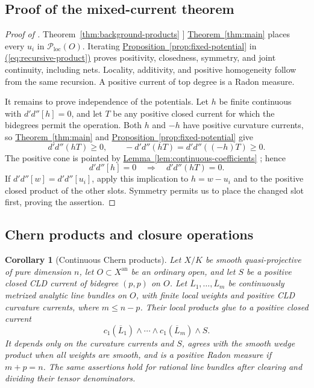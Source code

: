 \documentclass[11pt]{amsart}
\newtheorem{corollary}[theorem]{Corollary}
\theoremstyle{definition}
\theoremstyle{remark}
\numberwithin{equation}{section}
\newcommand{\ddc}{d'd''}
\newcommand{\an}{\mathrm{an}}
\newcommand{\Ploc}{\mathcal P_{\mathrm{loc}}}
\newcommand{\namedref}[2]{%
 \begingroup
 \ifstrequal{#1}{Section}{\hypersetup{linkcolor=sectionteal}}{%
  \ifstrequal{#1}{Appendix}{\hypersetup{linkcolor=sectionteal}}{}}%
 \hyperref[#2]{#1~\ref*{#2}}%
 \endgroup}
\renewcommand{\eqref}[1]{%
 \begingroup\hypersetup{linkcolor=equationviolet}%
 \hyperref[#1]{\textup{(\ref*{#1})}}%
 \endgroup}
\begin{document}
\subsection{Proof of the mixed-current theorem}
\label{subsec:mixed-current-proof}
\begin{proof}[Proof of \namedref{Theorem}{thm:background-products}]
\namedref{Theorem}{thm:main} places every \(u_i\) in \(\Ploc(O)\).
Iterating \namedref{Proposition}{prop:fixed-potential} in
\eqref{eq:recursive-product} proves positivity, closedness, symmetry,
and joint continuity, including nets. Locality, additivity, and
positive homogeneity follow from the same recursion. A positive
current of top degree is a Radon measure.

It remains to prove independence of the potentials. Let \(h\) be
finite continuous with \(\ddc[h]=0\), and let \(T\) be any positive
closed current for which the bidegrees permit the operation. Both
\(h\) and \(-h\) have positive curvature currents, so
\namedref{Theorem}{thm:main} and \namedref{Proposition}{prop:fixed-potential} give
\[
 \ddc(hT)\geq0,\qquad
 -\ddc(hT)=\ddc((-h)T)\geq0.
\]
The positive cone is pointed by \namedref{Lemma}{lem:continuous-coefficients}; hence
\begin{equation}\label{eq:continuous-kernel}
 \ddc[h]=0\quad\Longrightarrow\quad\ddc(hT)=0.
\end{equation}
If \(\ddc[w]=\ddc[u_i]\), apply this implication to \(h=w-u_i\)
and to the positive closed product of the other slots. Symmetry permits
us to place the changed slot first, proving the assertion.
\end{proof}

\subsection{Chern products and closure operations}
\begin{corollary}[Continuous Chern products]
\label{cor:continuous-chern-products}
Let \(X/K\) be smooth quasi-projective of pure dimension \(n\), let
\(O\subset X^\an\) be an ordinary open, and let \(S\) be a positive
closed CLD current of bidegree \((p,p)\) on \(O\). Let
\(\overline L_1,\ldots,\overline L_m\) be continuously metrized
analytic line bundles on \(O\), with finite local weights and positive
CLD curvature currents, where \(m\leq n-p\). Their local products
glue to a positive closed current
\[
 c_1(\overline L_1)\wedge\cdots\wedge c_1(\overline L_m)\wedge S.
\]
It depends only on the curvature currents and \(S\), agrees with the
smooth wedge product when all weights are smooth, and is a positive
Radon measure if \(m+p=n\). The same assertions hold for rational line
bundles after clearing and dividing their tensor denominators.
\end{corollary}
\end{document}
